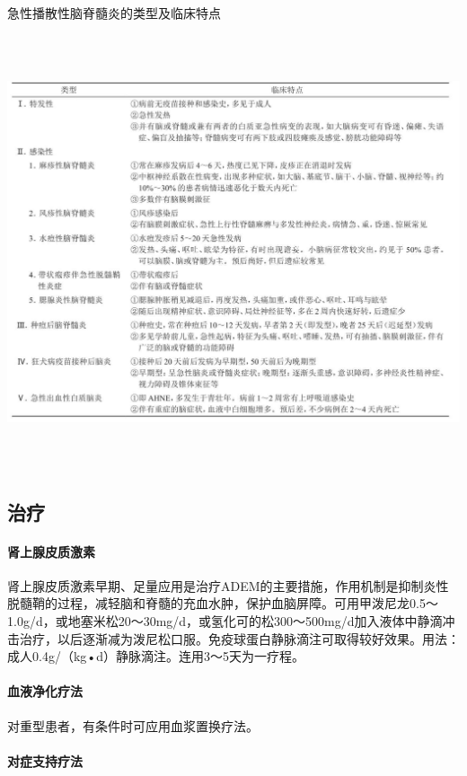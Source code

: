 \begin{table}[htbp]
\centering
\caption{急性播散性脑脊髓炎的类型及临床特点}
\label{tab89-1}
\includegraphics[width=6.67708in,height=5.03125in]{./images/Image00391.jpg}
\end{table}

\subsection{治疗}

\paragraph{肾上腺皮质激素}

肾上腺皮质激素早期、足量应用是治疗ADEM的主要措施，作用机制是抑制炎性脱髓鞘的过程，减轻脑和脊髓的充血水肿，保护血脑屏障。可用甲泼尼龙0.5～1.0g/d，或地塞米松20～30mg/d，或氢化可的松300～500mg/d加入液体中静滴冲击治疗，以后逐渐减为泼尼松口服。免疫球蛋白静脉滴注可取得较好效果。用法：成人0.4g/（kg•d）静脉滴注。连用3～5天为一疗程。

\paragraph{血液净化疗法}

对重型患者，有条件时可应用血浆置换疗法。

\paragraph{对症支持疗法}

